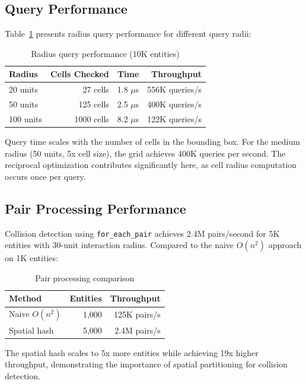 \documentclass[11pt]{article}
\begin{document}
\subsection{Query Performance}

Table~\ref{tab:query} presents radius query performance for different query radii:

\begin{table}[h]
\centering
\caption{Radius query performance (10K entities)}
\label{tab:query}
\begin{tabular}{lrrr}
\toprule
Radius & Cells Checked & Time & Throughput \\
\midrule
20 units & 27 cells & 1.8 $\mu$s & 556K queries/s \\
50 units & 125 cells & 2.5 $\mu$s & 400K queries/s \\
100 units & 1000 cells & 8.2 $\mu$s & 122K queries/s \\
\bottomrule
\end{tabular}
\end{table}

Query time scales with the number of cells in the bounding box. For the medium radius (50 units, 5x cell size), the grid achieves 400K queries per second. The reciprocal optimization contributes significantly here, as cell radius computation occurs once per query.

\subsection{Pair Processing Performance}

Collision detection using \texttt{for\_each\_pair} achieves 2.4M pairs/second for 5K entities with 30-unit interaction radius. Compared to the naive $O(n^2)$ approach on 1K entities:

\begin{table}[h]
\centering
\caption{Pair processing comparison}
\label{tab:pairs}
\begin{tabular}{lrr}
\toprule
Method & Entities & Throughput \\
\midrule
Naive $O(n^2)$ & 1,000 & 125K pairs/s \\
Spatial hash & 5,000 & 2.4M pairs/s \\
\bottomrule
\end{tabular}
\end{table}

The spatial hash scales to 5x more entities while achieving 19x higher throughput, demonstrating the importance of spatial partitioning for collision detection.
\end{document}
